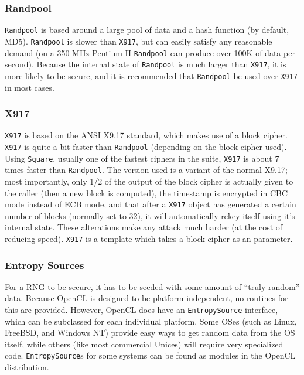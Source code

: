\documentclass{article}
\newcommand{\type}[1]{\texttt{#1}}
\begin{document}
\subsubsection{Randpool}

\type{Randpool} is based around a large pool of data and a hash function (by
default, MD5). \type{Randpool} is slower than \type{X917}, but can easily
satisfy any reasonable demand (on a 350 MHz Pentium II \type{Randpool} can
produce over 100K of data per second). Because the internal state of
\type{Randpool} is much larger than \type{X917}, it is more likely to be
secure, and it is recommended that \type{Randpool} be used over \type{X917} in
most cases.

\subsubsection{X917}

\type{X917} is based on the ANSI X9.17 standard, which makes use of a block
cipher.  \type{X917} is quite a bit faster than \type{Randpool} (depending on
the block cipher used).  Using \type{Square}, usually one of the fastest
ciphers in the suite, \type{X917} is about 7 times faster than
\type{Randpool}. The version used is a variant of the normal X9.17; most
importantly, only 1/2 of the output of the block cipher is actually given to
the caller (then a new block is computed), the timestamp is encrypted in CBC
mode instead of ECB mode, and that after a \type{X917} object has generated a
certain number of blocks (normally set to 32), it will automatically rekey
itself using it's internal state. These alterations make any attack much harder
(at the cost of reducing speed). \type{X917} is a template which takes a block
cipher as an parameter.

\subsubsection{Entropy Sources}

For a RNG to be secure, it has to be seeded with some amount of ``truly
random'' data. Because OpenCL is designed to be platform independent, no
routines for this are provided. However, OpenCL does have an
\type{EntropySource} interface, which can be subclassed for each individual
platform. Some OSes (such as Linux, FreeBSD, and Windows NT) provide easy ways
to get random data from the OS itself, while others (like most commercial
Unices) will require very specialized code. \type{EntropySource}s for some
systems can be found as modules in the OpenCL distribution.
\end{document}
